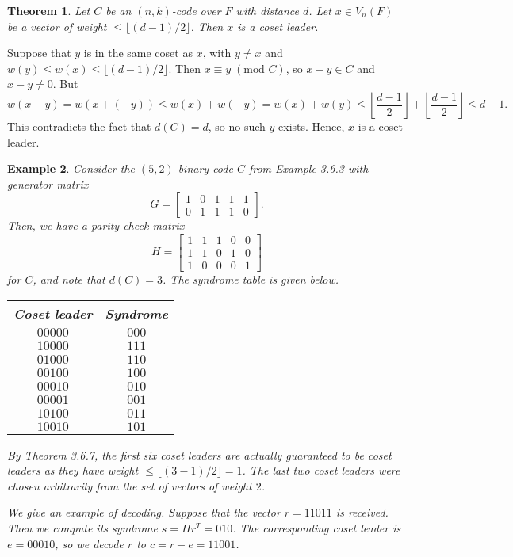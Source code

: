 \documentclass[10pt]{article}
\makeatletter
\theoremstyle{newstyle}
\newtheorem{thm}{Theorem}[subsection]
\newtheorem{exmp}[thm]{Example}
\newenvironment{pf}[1][\proofname]{\par
  \pushQED{\qed}%
  \normalfont \topsep0\p@\relax
  \trivlist
  \item[\hskip\labelsep\scshape
  #1\@addpunct{.}]\ignorespaces
}{%
  \popQED\endtrivlist\@endpefalse
}
\makeatother
\begin{document}
\begin{thm}
Let $C$ be an $(n, k)$-code over $F$ with distance $d$. Let $x \in V_n(F)$ be a vector of 
weight $\leq \lfloor (d-1)/2 \rfloor$. Then $x$ is a coset leader. 
\end{thm}
\begin{pf}
Suppose that $y$ is in the same coset as $x$, with $y \neq x$ and $w(y) \leq w(x) \leq 
\lfloor (d-1)/2 \rfloor$. Then $x \equiv y \; (\text{mod } C)$, so $x - y \in C$ and 
$x - y \neq 0$. But 
\[ w(x-y) = w(x+(-y)) \leq w(x) + w(-y) = w(x) + w(y) \leq \left\lfloor \frac{d-1}2 \right\rfloor
+ \left\lfloor \frac{d-1}2 \right\rfloor \leq d-1. \]
This contradicts the fact that $d(C) = d$, so no such $y$ exists. Hence, $x$ is a coset leader. 
\end{pf}

\begin{exmp}
Consider the $(5, 2)$-binary code $C$ from Example 3.6.3 with generator matrix 
\[ G = \begin{bmatrix} 1 & 0 & 1 & 1 & 1 \\ 0 & 1 & 1 & 1 & 0 \end{bmatrix}. \]
Then, we have a parity-check matrix 
\[ H = \begin{bmatrix}
1 & 1 & 1 & 0 & 0 \\ 1 & 1 & 0 & 1 & 0 \\ 1 & 0 & 0 & 0 & 1 
\end{bmatrix} \]
for $C$, and note that $d(C) = 3$. The syndrome table is given below. 
\begin{table}[H]
\centering
\begin{tabular}{c|c}
Coset leader & Syndrome \\ \hline
$00000$      & $000$    \\
$10000$      & $111$    \\
$01000$      & $110$    \\
$00100$      & $100$    \\
$00010$      & $010$    \\
$00001$      & $001$    \\
$10100$      & $011$    \\
$10010$      & $101$   
\end{tabular}
\end{table}
By Theorem 3.6.7, the first six coset leaders are actually guaranteed to be coset leaders 
as they have weight $\leq \lfloor (3-1)/2 \rfloor = 1$. The last two coset leaders 
were chosen arbitrarily from the set of vectors of weight $2$. 

We give an example of decoding. Suppose that the vector $r = 11011$ is received. Then we compute its syndrome 
$s = Hr^T = 010$. The corresponding coset leader is $e = 00010$, so we decode $r$ to 
$c = r-e = 11001$. 
\end{exmp}
\end{document}
